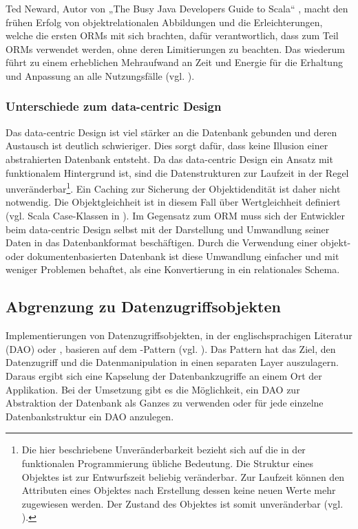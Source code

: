 Ted Neward, Autor von „The Busy Java Developers Guide to Scala“ \cite{busy-to-scala}, macht den frühen Erfolg von objektrelationalen Abbildungen und die Erleichterungen, welche die ersten ORMs mit sich brachten, dafür verantwortlich, dass zum Teil ORMs verwendet werden, ohne deren Limitierungen zu beachten. Das wiederum führt zu einem erheblichen Mehraufwand an Zeit und Energie für die Erhaltung und Anpassung an alle Nutzungsfälle (vgl. \cite{vietnam}).

\subsubsection{Unterschiede zum data-centric Design}
Das data-centric Design ist viel stärker an die Datenbank gebunden und deren Austausch ist deutlich schwieriger. Dies sorgt dafür, dass keine Illusion einer abstrahierten Datenbank entsteht. Da das data-centric Design ein Ansatz mit funktionalem Hintergrund ist, sind die Datenstrukturen zur Laufzeit in der Regel unveränderbar\footnote{Die hier beschriebene Unveränderbarkeit bezieht sich auf die in der funktionalen Programmierung übliche Bedeutung. Die Struktur eines Objektes ist zur Entwurfszeit beliebig veränderbar. Zur Laufzeit können den Attributen eines Objektes nach Erstellung dessen keine neuen Werte mehr zugewiesen werden. Der Zustand des Objektes ist somit unveränderbar (vgl. \cite[p.~181]{programmieren-in-scala}).}. Ein Caching zur Sicherung der Objektidendität ist daher nicht notwendig. Die Objektgleichheit ist in diesem Fall über Wertgleichheit definiert (vgl. Scala Case-Klassen in \cite{scala-case-class}). Im Gegensatz zum ORM muss sich der Entwickler beim data-centric Design selbst mit der Darstellung und Umwandlung seiner Daten in das Datenbankformat beschäftigen. Durch die Verwendung einer objekt- oder dokumentenbasierten Datenbank ist diese Umwandlung einfacher und mit weniger Problemen behaftet, als eine Konvertierung in ein relationales Schema.

\subsection{Abgrenzung zu Datenzugriffsobjekten}
Implementierungen von Datenzugriffsobjekten, in der englischsprachigen Literatur  (DAO) oder , basieren auf dem -Pattern (vgl. \cite{j2ee-pattern}).  Das Pattern hat das Ziel, den Datenzugriff und die Datenmanipulation in einen separaten Layer auszulagern. Daraus ergibt sich eine Kapselung der Datenbankzugriffe an einem Ort der Applikation. Bei der Umsetzung gibt es die Möglichkeit, ein DAO zur Abstraktion der Datenbank als Ganzes zu verwenden oder für jede einzelne Datenbankstruktur ein DAO anzulegen.

